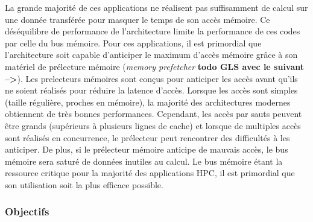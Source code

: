     
        La grande majorité de ces applications ne réalisent pas suffisamment de calcul sur une donnée transférée pour masquer le temps de son accès mémoire. Ce déséquilibre de performance de l'architecture limite la performance de ces codes par celle du bus mémoire. 
        Pour ces applications, il est primordial que l'architecture soit capable d'anticiper le maximum d'accès mémoire grâce à son matériel de prélecture mémoire (\textit{memory prefetcher} \textbf{todo GLS avec le suivant -->}). Les \glspl{prelecteur} mémoires sont conçus pour anticiper les accès avant qu'ils ne soient réalisés pour réduire la latence d'accès. Lorsque les accès sont simples (taille régulière, proches en mémoire), la majorité des architectures modernes obtiennent de très bonnes performances. Cependant, les accès par sauts peuvent être grands (supérieurs à plusieurs lignes de cache) et lorsque de multiples accès sont réalisés en concurrence, le prélecteur peut rencontrer des difficultés à les anticiper. De plus, si le prélecteur mémoire anticipe de mauvais accès, le bus mémoire sera saturé de données inutiles au calcul. Le bus mémoire étant la ressource critique pour la majorité des applications HPC, il est primordial que son utilisation soit la plus efficace possible.  
    
        

    \subsubsection{Objectifs}
        
